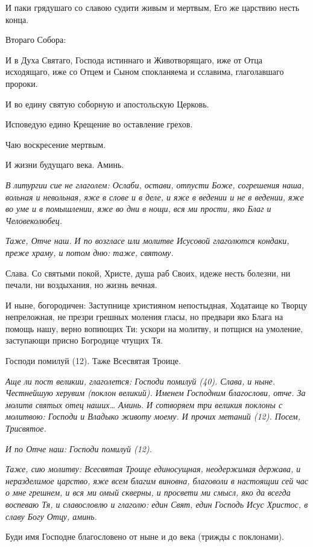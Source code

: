 И паки грядушаго со славою судити живым и мертвым, Его же царствию несть конца.

Втораго Собора:

И в Духа Святаго, Господа истиннаго и Животворящаго, иже от Отца исходящаго, иже со Отцем и Сыном спокланяема и сславима, глаголавшаго пророки.

И во едину святую соборную и апостольскую Церковь.

Исповедую едино Крещение во оставление грехов.

Чаю воскресение мертвым.

И жизни будущаго века. Аминь.


\itshape В литургии сие не глаголем:\normalfont{} Ослаби, остави, отпусти Боже, согрешения наша, вольная и невольная, яже в слове и в деле, и яже в ведении и не в ведении, яже во уме и в помышлении, яже во дни в нощи, вся ми прости, яко Благ и Человеколюбец.


\itshape Таже, Отче наш. И по возгласе или молитве Исусовой глаголются кондаки, преже храму, и потом дню: таже, святому.\normalfont{} 

Слава. Со святыми покой, Христе, душа раб Своих, идеже несть болезни, ни печали, ни воздыхания, но жизнь вечная.

И ныне, богородичен: Заступнице християном непостыдная, Ходатаице ко Творцу непреложная, не презри грешных моления гласы, но предвари яко Блага на помощь нашу, верно вопиющих Ти: ускори на молитву, и потщися на умоление, заступающи присно Богродице чтущих Тя. 

Господи помилуй (12). Таже Всесвятая Троице.


\itshape Аще ли пост великии, глаголется:\normalfont{} Господи помилуй (40). Слава, и ныне. Честнейшую херувим (поклон великий). Именем Господним благослови, отче. За молитв святых отец наших… Аминь. И сотворяем три великия поклоны с молитвою: Господи и Владыко животу моему. И прочих метаний (12). Посем, Трисвятое.


\itshape И по Отче наш:\normalfont{} Господи помилуй (12).


\itshape Таже, сию молитву:\normalfont{} Всесвятая Троице единосущная, неодержимая держава, и неразделимое царство, яже всем благим виновна, благоволи в настоящии сей час о мне грешнем, и вся ми омый скверны, и просвети ми смысл, яко да всегда воспеваю Тя, и славословлю и глаголю: един Свят, един Господь Исус Христос, в славу Богу Отцу, аминь. 

Буди имя Господне благословено от ныне и до века (трижды с поклонами). 


